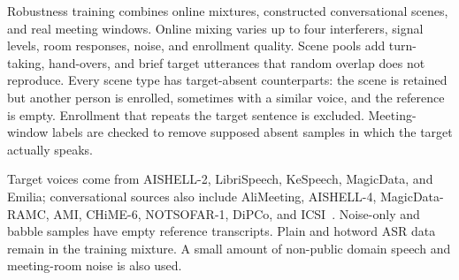 Robustness training combines online mixtures, constructed conversational scenes, and real meeting windows.
Online mixing varies up to four interferers, signal levels, room responses, noise, and enrollment quality.
Scene pools add turn-taking, hand-overs, and brief target utterances that random overlap does not reproduce.
Every scene type has target-absent counterparts: the scene is retained but another person is enrolled, sometimes with a similar voice, and the reference is empty.
Enrollment that repeats the target sentence is excluded.
Meeting-window labels are checked to remove supposed absent samples in which the target actually speaks.

Target voices come from AISHELL-2, LibriSpeech, KeSpeech, MagicData, and Emilia; conversational sources also include AliMeeting, AISHELL-4, MagicData-RAMC, AMI, CHiME-6, NOTSOFAR-1, DiPCo, and ICSI~\cite{panayotov2015librispeech,carletta2005ami,watanabe2020chime6,vinnikov2024notsofar,vansegbroeck2019dipco,janin2003icsi}.
Noise-only and babble samples have empty reference transcripts.
Plain and hotword ASR data remain in the training mixture.
A small amount of non-public domain speech and meeting-room noise is also used.
